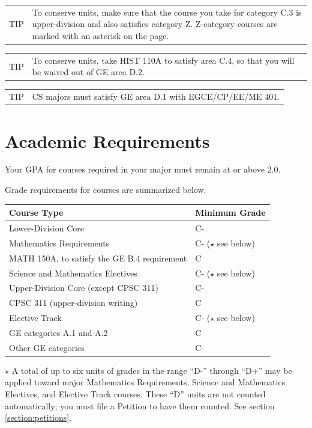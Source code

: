 \documentclass{book}
\newenvironment{tip}{
  \tcolorbox \begin{tabular}{m{.5in} m{5in}} \Large{TIP} &
}{
  \end{tabular} \endtcolorbox
}
\begin{document}
\begin{tip}
To conserve units, make sure that the course you take for category C.3 is upper-division and also satisfies category Z. Z-category courses are marked with an asterisk on the \gecourselist page.
\end{tip}

\begin{tip}
  To conserve units, take HIST 110A to satisfy area C.4, so that you will be waived out of GE area D.2.
  \end{tip}

\begin{tip}
CS majors must satisfy GE area D.1 with EGCE/CP/EE/ME 401.
\end{tip}

\section{Academic Requirements}

Your GPA for courses required in your major must remain at or above 2.0.

Grade requirements for courses are summarized below.

\begin{center}
\begin{tabular}{|l|l|} \hline
  \textbf{Course Type} & \textbf{Minimum Grade} \\ \hline
  Lower-Division Core & C- \\ \hline
  Mathematics Requirements & C- ($\star$ see below) \\ \hline
  MATH 150A, to satisfy the GE B.4 requirement & C \\ \hline
  Science and Mathematics Electives & C- ($\star$ see below) \\ \hline
  Upper-Division Core (except CPSC 311) & C- \\ \hline
  CPSC 311 (upper-division writing) & C \\ \hline
  Elective Track & C- ($\star$ see below) \\ \hline
  GE categories A.1 and A.2 & C \\ \hline
  Other GE categories & C- \\ \hline
\end{tabular}
\end{center}

$\star$ A total of up to six units of grades in the range ``D-'' through ``D+'' may be applied toward major Mathematics Requirements, Science and Mathematics Electives, and Elective Track courses. These ``D'' units are not counted automatically; you must file a Petition to have them counted. See section \ref{section:petitions}.
\end{document}
